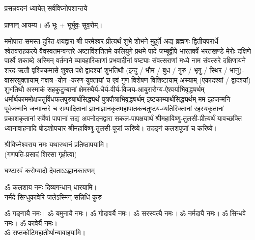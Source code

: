 
\setlength{\parindent}{0pt}




{प्रसन्नवदनं ध्यायेत् सर्वविघ्नोपशान्तये}
 
प्राणान्  आयम्य।  ॐ भूः + भूर्भुवः॒ सुव॒रोम्।


ममोपात्त-समस्त-दुरित-क्षयद्वारा श्री-परमेश्वर-प्रीत्यर्थं शुभे शोभने मुहूर्ते अद्य ब्रह्मणः
द्वितीयपरार्धे श्वेतवराहकल्पे वैवस्वतमन्वन्तरे अष्टाविंशतितमे कलियुगे प्रथमे पादे
जम्बूद्वीपे भारतवर्षे भरतखण्डे मेरोः दक्षिणे पार्श्वे शकाब्दे अस्मिन् वर्तमाने व्यावहारिकाणां प्रभवादीनां षष्ट्याः संवत्सराणां मध्ये \blank{} नाम संवत्सरे दक्षिणायने
शरद-ऋतौ  वृश्चिकमासे शुक्ल पक्षे द्वादश्यां शुभतिथौ
(इन्दु / भौम / बुध / गुरु / भृगु / स्थिर / भानु)-वासरयुक्तायाम्
\blank{} नक्षत्र \blank{}-योग  \blank-करण-युक्तायां च एवं गुण विशेषण विशिष्टायाम्
अस्याम् (एकादश्यां / द्वादश्यां) शुभतिथौ
अस्माकं सहकुटुम्बानां क्षेमस्थैर्य-धैर्य-वीर्य-विजय-आयुरारोग्य-ऐश्वर्याभिवृद्ध्यर्थम्
 धर्मार्थकाममोक्ष\-चतुर्विधफलपुरुषार्थसिद्ध्यर्थं पुत्रपौत्राभि\-वृद्ध्यर्थम् इष्टकाम्यार्थसिद्ध्यर्थम्
मम इहजन्मनि पूर्वजन्मनि जन्मान्तरे च सम्पादितानां ज्ञानाज्ञानकृतमहा\-पातकचतुष्टय-व्यतिरिक्तानां रहस्यकृतानां प्रकाशकृतानां सर्वेषां पापानां सद्य अपनोदनद्वारा सकल-पापक्षयार्थं श्रीमहाविष्णु-तुलसी-प्रीत्यर्थं यावच्छक्ति ध्यानावाहनादि
षोडशोपचार श्रीमहाविष्णु-तुलसी-पूजां करिष्ये। तदङ्गं कलशपूजां च करिष्ये।


श्रीविघ्नेश्वराय नमः यथास्थानं प्रतिष्ठापयामि।\\
(गणपति-प्रसादं शिरसा गृहीत्वा)



{घण्टारवं करोम्यादौ देवताऽऽह्वानकारणम्}

ॐ कलशाय नमः दिव्यगन्धान् धारयामि।\\

{नर्मदे सिन्धुकावेरि जलेऽस्मिन् सन्निधिं कुरु}

ॐ गङ्गायै नमः। ॐ यमुनायै नमः। ॐ गोदावर्यै नमः।  ॐ सरस्वत्यै नमः। ॐ नर्मदायै नमः। ॐ सिन्धवे नमः। ॐ कावेर्यै नमः।\\
 ॐ सप्तकोटिमहातीर्थान्यावाहयामि। \\

